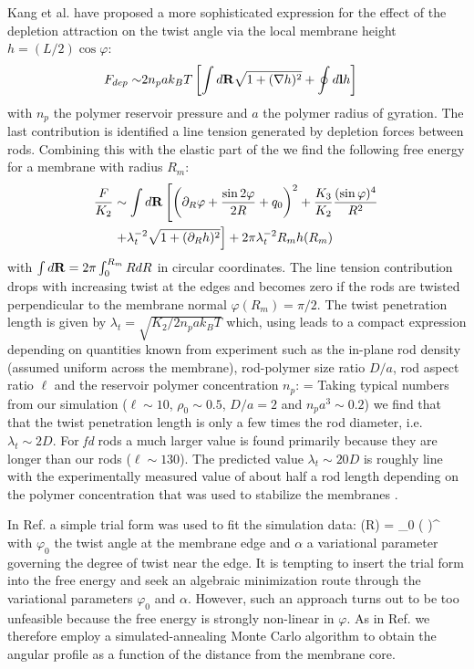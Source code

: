 Kang et al. \cite{kang_sm2016} have proposed a more sophisticated expression for the effect of the depletion attraction on the twist angle via the local membrane height $h = (L/2) \cos \varphi$: 
\begin{align}
F_{dep}  \sim & 2 n_{p} a k_{B}T \left [ \int  d {\bf R} \sqrt{ 1 + (\nabla h)^{2} } + \oint d {\bf l} h \right ]
\label{fdep1}
\end{align}
with $n_{p}$ the polymer reservoir pressure and $a$ the polymer radius of gyration. The last contribution is identified a line tension generated by depletion forces between rods. Combining this with the elastic part of the 
 we find the following free energy for a membrane with radius $R_{m}$:
\begin{align}
\frac{ F}{K_{2}}  &\sim \int  d {\bf R}   \left [  \left ( \partial_{R} \varphi + \frac{\sin 2 \varphi}{2R} + q_{0} \right )^{2}  + \frac{K_{3}}{K_{2}}\frac{ ( \sin \varphi )^{4}}{R^{2}} \right . \nonumber \\ 
& \left .  + \lambda_{t}^{-2}    \sqrt{ 1 + (\partial_{R} h)^{2} }   \right ]  + 2 \pi  \lambda_{t}^{-2} R_{m} h(R_{m})
\label{fmem1}
\end{align}
with $\int d {\bf R} = 2 \pi \int_{0}^{R_{m}} R dR $ in circular coordinates. The line tension contribution drops with increasing twist at the edges and  becomes zero if the rods are twisted perpendicular to the membrane normal $\varphi(R_{m}) = \pi/2$. 
The twist penetration length is given by $\lambda_{t} = \sqrt{K_{2}/2  n_{p} a k_{B}T}$ which, using  leads to a compact expression depending on quantities known from experiment such as the in-plane rod density (assumed uniform across the membrane), rod-polymer size ratio $D/a$, rod aspect ratio $\ell$ and the reservoir polymer concentration $n_{p}$: 
\beq
{} = 
\eeq
Taking typical numbers from our simulation ($\ell \sim 10$, $\rho_{0} \sim 0.5$, $D/a=2$ and $n_{p}a^{3} \sim 0.2$) we find that that the twist penetration length is only a few times the rod diameter, i.e. $\lambda_{t} \sim 2 D$. 
For {\em fd} rods a much larger value is found primarily because they are longer than our rods ($\ell \sim 130$). The predicted value $\lambda_{t} \sim 20 D$ is roughly line with the experimentally measured value of about half a rod length   depending on the polymer concentration that was used to stabilize the membranes \cite{barry_jpcb2009}.

In Ref. \cite{kuhnhold2022colloidal} a simple trial form was used to fit the simulation data:
\beq
\varphi(R) = \varphi_{0} \left (  \right )^{\alpha} 
\eeq
with $\varphi_{0}$ the twist angle at the membrane edge and $\alpha $ a variational parameter governing the degree of twist near the edge.  It is tempting to insert the trial form into the free energy  and seek an algebraic minimization route through the variational parameters $\varphi_{0}$ and $\alpha$.   However, such an approach turns out to be too unfeasible because the free energy is strongly non-linear in $\varphi$.  As in Ref. \cite{wensink2018elastic} we therefore employ a simulated-annealing Monte Carlo algorithm to obtain the angular profile as a function of the distance from the membrane core. 


